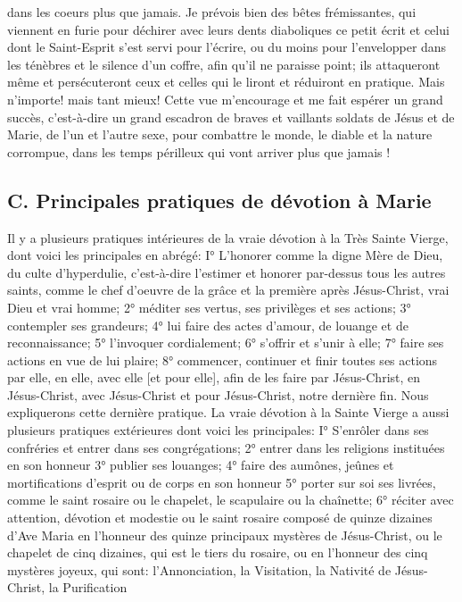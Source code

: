 dans les coeurs plus que jamais.
 Je prévois bien des bêtes frémissantes, qui viennent en furie pour déchirer avec leurs dents diaboliques ce
petit écrit et celui dont le Saint-Esprit s'est servi pour l'écrire, ou du moins pour l'envelopper dans les ténèbres et le
silence d'un coffre, afin qu'il ne paraisse point; ils attaqueront même et persécuteront ceux et celles qui le liront et
réduiront en pratique. Mais n'importe! mais tant mieux! Cette vue m'encourage et me fait espérer un grand succès,
c'est-à-dire un grand escadron de braves et vaillants soldats de Jésus et de Marie, de l'un et l'autre sexe, pour
combattre le monde, le diable et la nature corrompue, dans les temps périlleux qui vont arriver plus que jamais !
\subsection{C. Principales pratiques de dévotion à Marie}
 Il y a plusieurs pratiques intérieures de la vraie dévotion à la Très Sainte Vierge, dont voici les principales en
abrégé:
I° L'honorer comme la digne Mère de Dieu, du culte d'hyperdulie, c'est-à-dire l'estimer et honorer par-dessus tous
les autres saints, comme le chef d'oeuvre de la grâce et la première après Jésus-Christ, vrai Dieu et vrai homme;
2° méditer ses vertus, ses privilèges et ses actions; 3° contempler ses grandeurs; 4° lui faire des actes d'amour, de
louange et de reconnaissance; 5° l'invoquer cordialement; 6° s'offrir et s'unir à elle; 7° faire ses actions en vue de
lui plaire; 8° commencer, continuer et finir toutes ses actions par elle, en elle, avec elle [et pour elle], afin de les
faire par Jésus-Christ, en Jésus-Christ, avec Jésus-Christ et pour Jésus-Christ, notre dernière fin. Nous
expliquerons cette dernière pratique.
 La vraie dévotion à la Sainte Vierge a aussi plusieurs pratiques extérieures dont voici les principales:
I° S'enrôler dans ses confréries et entrer dans ses congrégations; 2° entrer dans les religions instituées en son
honneur 3° publier ses louanges; 4° faire des aumônes, jeûnes et mortifications d'esprit ou de corps en son
honneur 5° porter sur soi ses livrées, comme le saint rosaire ou le chapelet, le scapulaire ou la chaînette; 6° réciter
avec attention, dévotion et modestie ou le saint rosaire composé de quinze dizaines d'Ave Maria en l'honneur des
quinze principaux mystères de Jésus-Christ, ou le chapelet de cinq dizaines, qui est le tiers du rosaire, ou en
l'honneur des cinq mystères joyeux, qui sont: l'Annonciation, la Visitation, la Nativité de Jésus-Christ, la Purification
